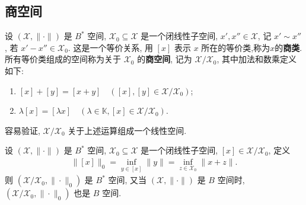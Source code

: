 \documentclass[../../main.tex]{subfiles}%
\begin{document}
\subsection{商空间}

\begin{definition}
设 $(\mathscr{X},\|\cdot\|)$ 是 $B^*$ 空间, $\mathscr{X}_0 \subseteq \mathscr{X}$ 是一个闭线性子空间, $x',x'' \in \mathscr{X}$, 记 $x' \sim x''$, 若 $x'-x'' \in \mathscr{X}_0$. 这是一个等价关系, 用 $[x]$ 表示 $x$ 所在的等价类,称为$x$的\textbf{商类}. 所有等价类组成的空间称为关于 $\mathscr{X}_0$ 的\textbf{商空间}, 记为 $\mathscr{X}/\mathscr{X}_0$, 其中加法和数乘定义如下:
\begin{enumerate}[(1)]
\item $[x] + [y] = [x+y] \quad ([x],[y] \in \mathscr{X}/\mathscr{X}_0)$;
\item $\lambda [x] = [\lambda x] \quad (\lambda \in \mathbb{K}, [x] \in \mathscr{X}/\mathscr{X}_0)$.
\end{enumerate}
容易验证, $\mathscr{X}/\mathscr{X}_0$ 关于上述运算组成一个线性空间.
\end{definition}

\begin{theorem}\label{theorem:闭线性子空间的商空间完备}
设 $(\mathscr{X},\|\cdot\|)$ 是 $B^*$ 空间, $\mathscr{X}_0 \subseteq \mathscr{X}$ 是一个闭线性子空间, $[x] \in \mathscr{X}/\mathscr{X}_0$, 定义
\begin{align*}
\|[x]\|_0 = \inf_{y \in [x]} \|y\|=\inf_{z\in\mathscr{X}_0} \|x+z\|.
\end{align*}
则 $(\mathscr{X}/\mathscr{X}_0,\|\cdot\|_0)$ 是 $B^*$ 空间, 又当 $(\mathscr{X},\|\cdot\|)$ 是 $B$ 空间时, $(\mathscr{X}/\mathscr{X}_0,\|\cdot\|_0)$ 也是 $B$ 空间.
\end{theorem}
\end{document}
